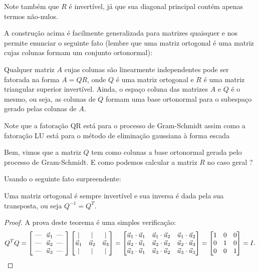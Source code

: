Note também que $R$ é invertível, já que sua diagonal principal contém apenas termos não-nulos.

A construção acima é facilmente generalizada para matrizes quaisquer e nos permite enunciar o seguinte fato
(lembre que uma matriz ortogonal é uma matriz cujas colunas formam um conjunto ortonormal):

\begin{teo}
Qualquer matriz $A$ cujas colunas são linearmente independentes pode ser fatorada na forma $A=QR$, onde $Q$ é uma matriz ortogonal
e $R$ é uma matriz triangular superior invertível. Ainda, o espaço coluna das matrizes $A$ e $Q$ é o mesmo, ou seja, as colunas de $Q$ formam uma base ortonormal para o subespaço gerado pelas colunas de $A$.
\end{teo}

Note que a fatoração QR está para o processo de Gram-Schmidt assim como a fatoração LU está para o método de  eliminação gaussiana à forma escada  %

Bem, vimos que a matriz $Q$ tem como colunas a base ortonormal gerada pelo processo de Gram-Schmidt. E como podemos calcular a matriz $R$ no caso geral ?

Usando o seguinte fato surpreendente:

\begin{teo}
Uma matriz ortogonal é sempre invertível e sua inversa é dada pela sua transposta, ou seja $Q^{-1}= Q^T$.
\end{teo}

\begin{proof}
A prova deste teorema é uma simples verificação:
\begin{equation}
Q^T Q =
\begin{bmatrix}
\text{ --- }\  \vec{u}_1 \, \text{ --- } \\
\text{ --- }\  \vec{u}_2 \, \text{ --- } \\
\text{ --- }\  \vec{u}_3 \, \text{ --- }
\end{bmatrix}
\begin{bmatrix}
| & | & | \\
\vec{u}_1 & \vec{u}_2 & \vec{u}_3 \\
| & | & |
\end{bmatrix} =
\begin{bmatrix}
\vec{u}_1 \cdot \vec{u}_1 & \vec{u}_1 \cdot \vec{u}_2 & \vec{u}_1 \cdot \vec{u}_2 \\
\vec{u}_2 \cdot \vec{u}_1 & \vec{u}_2 \cdot \vec{u}_2 & \vec{u}_2 \cdot \vec{u}_3 \\
\vec{u}_3 \cdot \vec{u}_1 & \vec{u}_3 \cdot \vec{u}_2 & \vec{u}_3 \cdot \vec{u}_3
\end{bmatrix} =
\begin{bmatrix}
1 & 0 & 0 \\
0 & 1 & 0 \\
0 & 0 & 1
\end{bmatrix} = I. \qedhere
\end{equation}
\end{proof}


